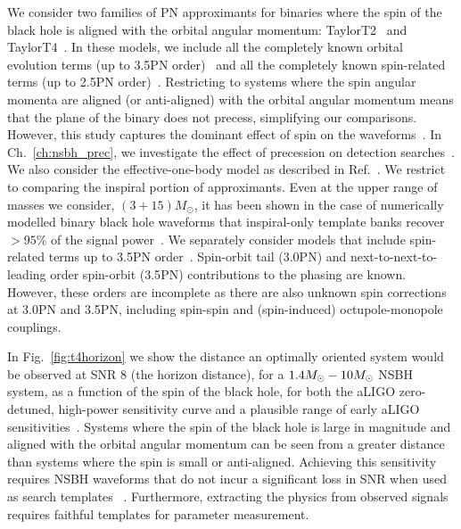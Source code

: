 We consider two families of \ac{PN} approximants for binaries where the spin
of the black hole is aligned with the orbital angular momentum:
TaylorT2~\cite{Blanchet:1996pi, Droz:1999qx, Blanchet:2006zz} and
TaylorT4~\cite{Buonanno:2002fy}.  In these models, we include all the
completely known orbital evolution terms (up to 3.5\ac{PN} order)~\cite{Wiseman:1993aj,Blanchet:1995fg,Blanchet:1995ez,Blanchet:1996pi,
Blanchet:2001ax, Blanchet:2004ek} and all the
completely known spin-related terms (up to 2.5\ac{PN}
order)~\cite{Faye:2006gx, Blanchet:2006gy, Kidder:1992fr, Mikoczi:2005dn,
Racine:2008kj}.  Restricting to systems where the spin angular momenta are
aligned (or anti-aligned) with the orbital angular momentum means that the
plane of the binary does not precess, simplifying our comparisons. However,
this study captures the dominant effect of spin on the
waveforms~\cite{Brown:2012gs}. In Ch.~\ref{ch:nsbh_prec}, we investigate the effect
of precession on detection searches~\cite{Harry:2013tca}.
We also consider the
effective-one-body model as described in Ref.~\cite{Taracchini:2012ig}. 
We restrict to comparing the inspiral portion of approximants. Even at the upper 
range of masses we consider, $(3+15)M_{\odot}$, it has been shown in the case of numerically modelled 
binary black hole waveforms that inspiral-only
template banks recover $> 95\%$ of the signal power~\cite{Brown:2012nn, Smith:2013mfa}.
We separately consider models that include
spin-related terms up to 3.5\ac{PN} order~\cite{Bohe:2013cla,
Blanchet:2011zv}. Spin-orbit tail (3.0\ac{PN}) and next-to-next-to-leading
order spin-orbit (3.5\ac{PN}) contributions to the phasing are known.
However, these orders are incomplete as there are also unknown spin
corrections at 3.0\ac{PN} and 3.5\ac{PN}, including spin-spin and
(spin-induced) octupole-monopole couplings. 

In Fig.~\ref{fig:t4horizon} we show  
the distance an optimally oriented system would be observed at \ac{SNR} 8 (the horizon distance),
for a $1.4M_\odot-10M_\odot$ \ac{NSBH} system, as a function of the spin of the
black hole, for both the \ac{aLIGO} zero-detuned, high-power sensitivity curve and a
plausible range of early \ac{aLIGO} sensitivities~\cite{Aasi:2013wya}. 
Systems where the spin of the black hole is large in magnitude and aligned with the orbital 
angular momentum can be seen from a greater distance than systems where the spin is 
small or anti-aligned. Achieving this sensitivity requires \ac{NSBH} waveforms that do not
incur a significant loss in \ac{SNR} when used as search templates ~\cite{Apostolatos:1996rf}.
Furthermore, extracting the physics from observed signals requires faithful templates for parameter measurement.

